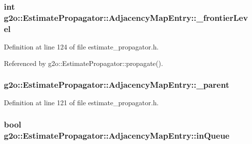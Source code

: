 \subsubsection[{\texorpdfstring{\+\_\+frontier\+Level}{_frontierLevel}}]{\setlength{\rightskip}{0pt plus 5cm}int g2o\+::\+Estimate\+Propagator\+::\+Adjacency\+Map\+Entry\+::\+\_\+frontier\+Level\hspace{0.3cm}{\ttfamily [protected]}}\hypertarget{classg2o_1_1EstimatePropagator_1_1AdjacencyMapEntry_a56bfab4074fa692f03378526007758f7}{}\label{classg2o_1_1EstimatePropagator_1_1AdjacencyMapEntry_a56bfab4074fa692f03378526007758f7}


Definition at line 124 of file estimate\+\_\+propagator.\+h.



Referenced by g2o\+::\+Estimate\+Propagator\+::propagate().

\subsubsection[{\texorpdfstring{\+\_\+parent}{_parent}}]{ g2o\+::\+Estimate\+Propagator\+::\+Adjacency\+Map\+Entry\+::\+\_\+parent\hspace{0.3cm}{\ttfamily [protected]}}\hypertarget{classg2o_1_1EstimatePropagator_1_1AdjacencyMapEntry_a72384502361d60e1f3ae1644de1e7379}{}\label{classg2o_1_1EstimatePropagator_1_1AdjacencyMapEntry_a72384502361d60e1f3ae1644de1e7379}


Definition at line 121 of file estimate\+\_\+propagator.\+h.

\subsubsection[{\texorpdfstring{in\+Queue}{inQueue}}]{\setlength{\rightskip}{0pt plus 5cm}bool g2o\+::\+Estimate\+Propagator\+::\+Adjacency\+Map\+Entry\+::in\+Queue\hspace{0.3cm}{\ttfamily [private]}}\hypertarget{classg2o_1_1EstimatePropagator_1_1AdjacencyMapEntry_a6697b7728a51b80663f843daba54e2d8}{}\label{classg2o_1_1EstimatePropagator_1_1AdjacencyMapEntry_a6697b7728a51b80663f843daba54e2d8}


